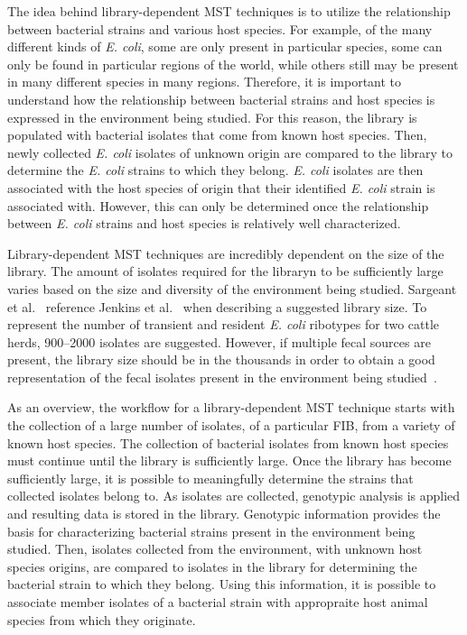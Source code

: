 \documentclass[12pt]{ucthesis}
\begin{document}
   The idea behind library-dependent MST techniques is to utilize
   the relationship between bacterial strains and various host species. For
   example, of the many different kinds of \textit{E. coli}, some are only
   present in particular species, some can only be found in particular regions
   of the world, while others still may be present in many different species in
   many regions. Therefore, it is important to understand how the relationship
   between bacterial strains and host species is expressed in the environment
   being studied. For this reason, the library is populated with bacterial
   isolates that come from known host species. Then, newly collected \textit{E.
   coli} isolates of unknown origin are compared to the library to determine
   the \textit{E. coli} strains to which they belong. \textit{E. coli} isolates
   are then associated with the host species of origin that their identified
   \textit{E. coli} strain is associated with. However, this can only be
   determined once the relationship between \textit{E. coli} strains and host
   species is relatively well characterized.

   Library-dependent MST techniques are incredibly dependent on the
   size of the library. The amount of isolates required for the libraryn to be
   sufficiently large varies based on the size and diversity of the environment
   being studied. Sargeant et al.~\cite{Sargeant:ReviewMST} reference Jenkins
   et al.~\cite{Jenkins:Steers} when describing a suggested library size. To
   represent the number of transient and resident \textit{E. coli} ribotypes
   for two cattle herds, 900--2000 isolates are suggested. However, if multiple
   fecal sources are present, the library size should be in the thousands in
   order to obtain a good representation of the fecal isolates present in the
   environment being studied~\cite{Sargeant:ReviewMST}.
   
   As an overview, the workflow for a library-dependent MST technique starts
   with the collection of a large number of isolates, of a particular
   FIB, from a variety of known host species. The collection of bacterial
   isolates from known host species must continue until the library is
   sufficiently large. Once the library has become sufficiently large, it is
   possible to meaningfully determine the strains that collected isolates
   belong to. As isolates are collected, genotypic analysis is applied and
   resulting data is stored in the library. Genotypic information provides the
   basis for characterizing bacterial strains present in the environment being
   studied. Then, isolates collected from the environment, with unknown host
   species origins, are compared to isolates in the library for determining the
   bacterial strain to which they belong. Using this information, it is
   possible to associate member isolates of a bacterial strain with appropraite
   host animal species from which they originate.
\end{document}
